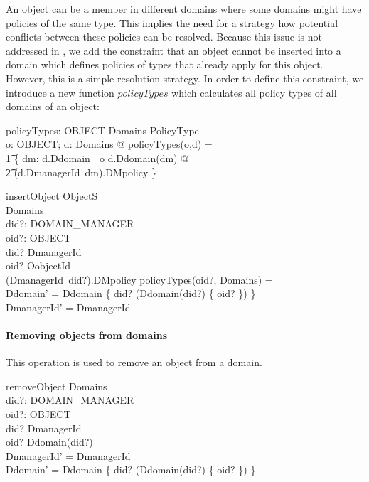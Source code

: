 An object can be a member in different domains where some domains might have
policies of the same type.  This implies the need for a strategy how potential
conflicts between these policies can be resolved.  Because this issue is not
addressed in \corbasec, we add the constraint that an object cannot be inserted
into a domain which defines policies of types that already apply for this
object.  However, this is a simple resolution strategy.  In order to define this
constraint, we introduce a new function $policyTypes$ which calculates all
policy types of all domains of an object:
\begin{axdef}
  policyTypes: OBJECT \cross Domains \fun \power PolicyType \\
  \where
  \forall o: OBJECT; d: Domains @ policyTypes(o,d) = \\
  \t1 \bigcup \{ dm: \dom d.Ddomain | o \in d.Ddomain(dm) @ \\
  \t2 \dom (d.DmanagerId~dm).DMpolicy \}
\end{axdef}
\begin{schema}{insertObject}
  \Xi ObjectS \\
  \Delta Domains \\
  did?: DOMAIN\_MANAGER \\
  oid?: OBJECT \\
  \where
  did? \in \dom DmanagerId \\
  oid? \in \dom OobjectId \\
  \dom (DmanagerId~did?).DMpolicy \cap policyTypes(oid?, \theta Domains) =
  \emptyset \\
  
  Ddomain' = Ddomain \oplus \{ did? \mapsto (Ddomain(did?) \cup \{ oid? \}) \} \\
  DmanagerId' = DmanagerId \\
\end{schema}


\paragraph{Removing objects from domains} 
This operation is used to remove an object from a domain.
\begin{schema}{removeObject}
  \Delta Domains \\
  did?: DOMAIN\_MANAGER \\
  oid?: OBJECT \\
  \where
  did? \in \dom DmanagerId \\
  oid? \in Ddomain(did?) \\
  DmanagerId' = DmanagerId \\
  Ddomain' = Ddomain \oplus \{ did? \mapsto (Ddomain(did?) \setminus \{ oid? \})
  \} \\
\end{schema}


